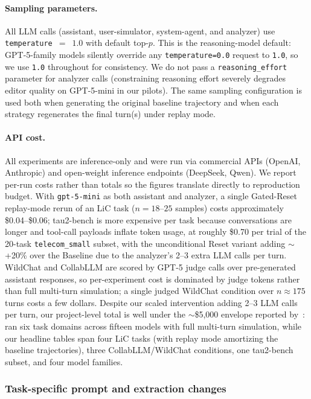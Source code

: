 \documentclass{article}
\begin{document}
\paragraph{Sampling parameters.} All LLM calls (assistant, user-simulator, system-agent, and analyzer) use \texttt{temperature}~$=$~$1.0$ with default top-$p$. This is the reasoning-model default: GPT-5-family models silently override any \texttt{temperature=0.0} request to \texttt{1.0}, so we use \texttt{1.0} throughout for consistency. We do not pass a \texttt{reasoning\_effort} parameter for analyzer calls (constraining reasoning effort severely degrades editor quality on GPT-5-mini in our pilots). The same sampling configuration is used both when generating the original baseline trajectory and when each strategy regenerates the final turn(s) under replay mode.

\paragraph{API cost.} All experiments are inference-only and were run via commercial APIs (OpenAI, Anthropic) and open-weight inference endpoints (DeepSeek, Qwen). We report per-run costs rather than totals so the figures translate directly to reproduction budget. With \texttt{gpt-5-mini} as both assistant and analyzer, a single Gated-Reset replay-mode rerun of an LiC task ($n{=}18$--$25$ samples) costs approximately \$0.04--\$0.06; tau2-bench is more expensive per task because conversations are longer and tool-call payloads inflate token usage, at roughly \$0.70 per trial of the 20-task \texttt{telecom\_small} subset, with the unconditional Reset variant adding $\sim$+20\% over the Baseline due to the analyzer's 2--3 extra LLM calls per turn. WildChat and CollabLLM are scored by GPT-5 judge calls over pre-generated assistant responses, so per-experiment cost is dominated by judge tokens rather than full multi-turn simulation; a single judged WildChat condition over $n{\approx}175$ turns costs a few dollars. Despite our scaled intervention adding 2--3 LLM calls per turn, our project-level total is well under the $\sim$\$5{,}000 envelope reported by~\citet{laban2025lost}: \citeauthor{laban2025lost} ran six task domains across fifteen models with full multi-turn simulation, while our headline tables span four LiC tasks (with replay mode amortizing the baseline trajectories), three CollabLLM/WildChat conditions, one tau2-bench subset, and four model families.

\subsubsection{Task-specific prompt and extraction changes}
\label{app:eval-adjustments}
\end{document}
